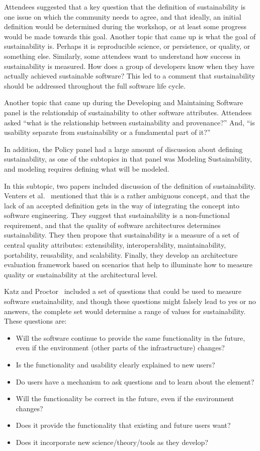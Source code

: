 \documentclass[11pt, oneside]{amsart}
\begin{document}
Attendees suggested that a key question that the definition of sustainability
is one issue on which the community needs to agree, and that ideally, an
initial definition would be determined during the workshop, or at least some
progress would be made towards this goal.  Another topic that came up is what
the goal of sustainability is.  Perhaps it is reproducible science, or
persistence, or quality, or something else.  Similarly, some attendees want to
understand how success in sustainability is measured.  How does a group of
developers know when they have actually achieved sustainable software? This led
to a comment that sustainability should be addressed throughout the full
software life cycle.

Another topic that came up during the Developing and Maintaining Software panel
is the relationship of sustainability to other software attributes.  Attendees
asked ``what is the relationship between sustainability and provenance?'' And,
``is usability separate from sustainability or a fundamental part of it?''

In addition, the Policy panel had a large amount of discussion about defining
sustainability, as one of the subtopics in that panel was Modeling
Sustainability, and modeling requires defining what will be modeled.

In this subtopic, two papers included discussion of the definition of
sustainability.  Venters et al.~\cite{Venters_WSSSPE} mentioned that this is a
rather ambiguous concept, and that the lack of an accepted definition gets in
the way of integrating the concept into software engineering. They suggest that
sustainability is a non-functional requirement, and that the quality of
software architectures determines sustainability.  They then propose that
sustainability is a measure of a set of central quality attributes:
extensibility, interoperability, maintainability, portability, reusability, and
scalability. Finally, they develop an architecture evaluation framework based
on scenarios that help to illuminate how to measure quality or sustainability
at the architectural level.

Katz and Proctor~\cite{Katz_WSSSPE} included a set of questions that could be
used to measure software sustainability, and though these questions might
falsely lead to yes or no answers, the complete set would determine a range of
values for sustainability. These questions are:
\begin{itemize}
\item Will the software continue to provide the same functionality in the future,
      even if the environment (other parts of the infrastructure) changes?
\item Is the functionality and usability clearly explained to new users?
\item Do users have a mechanism to ask questions and to learn about the element?
\item Will the functionality be correct in the future, even if the environment changes?
\item Does it provide the functionality that existing and future users want?
\item Does it incorporate new science/theory/tools as they develop?
\end{itemize}
\end{document}
